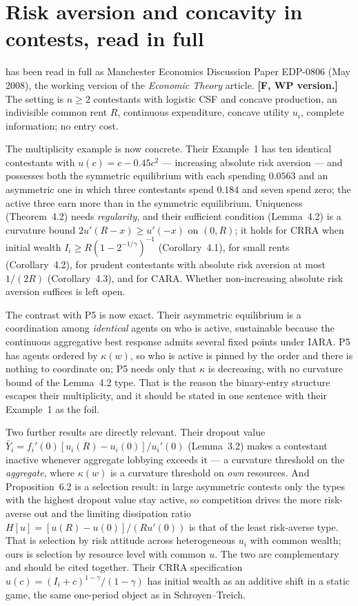 \documentclass[11pt,a4paper]{article}
\begin{document}
\section{Risk aversion and concavity in contests, read in full}

\citet{CornesHartley2012} has been read in full as Manchester Economics
Discussion Paper EDP-0806 (May 2008), the working version of the
\emph{Economic Theory} article. \textbf{[F, WP version.]} The setting is $n
\geq 2$ contestants with logistic CSF and concave production, an indivisible
common rent $R$, continuous expenditure, concave utility $u_i$, complete
information; no entry cost.

The multiplicity example is now concrete. Their Example~1 has ten identical
contestants with $u(c) = c - 0.45c^2$ --- increasing absolute risk aversion ---
and possesses both the symmetric equilibrium with each spending $0.0563$ and an
asymmetric one in which three contestants spend $0.184$ and seven spend zero;
the active three earn more than in the symmetric equilibrium. Uniqueness
(Theorem~4.2) needs \emph{regularity}, and their sufficient condition
(Lemma~4.2) is a curvature bound $2u'(R-x) \geq u'(-x)$ on $(0,R)$; it holds
for CRRA when initial wealth $I_i \geq R(1 - 2^{-1/\gamma})^{-1}$
(Corollary~4.1), for small rents (Corollary~4.2), for prudent contestants with
absolute risk aversion at most $1/(2R)$ (Corollary~4.3), and for CARA. Whether
non-increasing absolute risk aversion suffices is left open.

The contrast with P5 is now exact. Their asymmetric equilibrium is a
coordination among \emph{identical} agents on who is active, sustainable
because the continuous aggregative best response admits several fixed points
under IARA. P5 has agents ordered by $\kappa(w)$, so who is active is pinned
by the order and there is nothing to coordinate on; P5 needs only that
$\kappa$ is decreasing, with no curvature bound of the Lemma~4.2 type. That is
the reason the binary-entry structure escapes their multiplicity, and it should
be stated in one sentence with their Example~1 as the foil.

Two further results are directly relevant. Their dropout value $\bar Y_i =
f_i'(0)[u_i(R) - u_i(0)]/u_i'(0)$ (Lemma~3.2) makes a contestant inactive
whenever aggregate lobbying exceeds it --- a curvature threshold on the
\emph{aggregate}, where $\kappa(w)$ is a curvature threshold on \emph{own}
resources. And Proposition~6.2 is a selection result: in large asymmetric
contests only the types with the highest dropout value stay active, so
competition drives the more risk-averse out and the limiting dissipation ratio
$H[u] = [u(R) - u(0)]/(Ru'(0))$ is that of the least risk-averse type. That is
selection by risk attitude across heterogeneous $u_i$ with common wealth; ours
is selection by resource level with common $u$. The two are complementary and
should be cited together. Their CRRA specification $u(c) = (I_i + c)^{1-\gamma}
/(1-\gamma)$ has initial wealth as an additive shift in a static game, the same
one-period object as in Schroyen--Treich.
\end{document}
